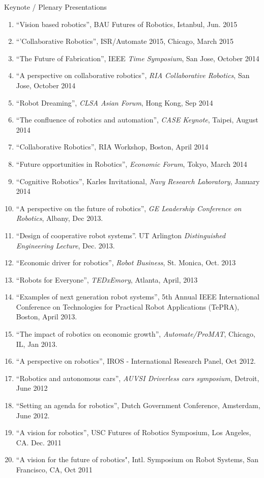 \documentclass{article}
\begin{document}
\begin{cv}
\begin{cvlist}{Keynote / Plenary Presentations}
\begin{enumerate}
  \item ``Vision based robotics'', BAU Futures of Robotics, Istanbul, Jun. 2015
  \item ``'Collaborative Robotics'', ISR/Automate 2015, Chicago, March 2015
  \item ``The Future of Fabrication'', IEEE {\em Time Symposium}, San Jose, October 2014
  \item ``A perspective on collaborative robotics'', {\em RIA Collaborative Robotics}, San Jose, October 2014
  \item ``Robot Dreaming'', {\em CLSA Asian Forum}, Hong Kong, Sep 2014
  \item ``The confluence of robotics and automation'', {\em CASE Keynote}, Taipei, August 2014
  \item ``Collaborative Robotics'', RIA Workshop, Boston, April 2014
  \item ``Future opportunities in Robotics'', {\em Economic Forum}, Tokyo, March 2014
  \item ``Cognitive Robotics'', Karles Invitational, {\em Navy Research Laboratory}, January 2014
  \item ``A perspective on the future of robotics'', {\em GE Leadership Conference on Robotics}, Albany, Dec 2013.
  \item ``Design of cooperative robot systems''. UT Arlington {\em Distinguished Engineering Lecture}, Dec. 2013.
  \item ``Economic driver for robotics'', {\em Robot Business}, St. Monica,  Oct. 2013
  \item ``Robots for Everyone'', {\em TEDxEmory}, Atlanta, April, 2013
  \item ``Examples of next generation robot systems'', 5th Annual IEEE
    International Conference on Technologies for Practical Robot
    Applications (TePRA), Boston, April 2013.
  \item ``The impact of robotics on economic growth'', {\em Automate/ProMAT}, Chicago, IL, Jan 2013.
  \item ``A perspective on robotics'', IROS - International Research  Panel, Oct 2012.
  \item ``Robotics and autonomous cars'', {\em AUVSI Driverless cars symposium}, Detroit, June 2012
  \item ``Setting an agenda for robotics'', Dutch Government  Conference, Amsterdam, June 2012.
  \item ``A vision for robotics'', USC Futures of Robotics Symposium, Los Angeles, CA.  Dec. 2011
  \item ``A vision for the future of robotics", Intl. Symposium on Robot Systems, San Francisco, CA, Oct 2011

\end{enumerate}
\end{cvlist}
\end{cv}
\end{document}
